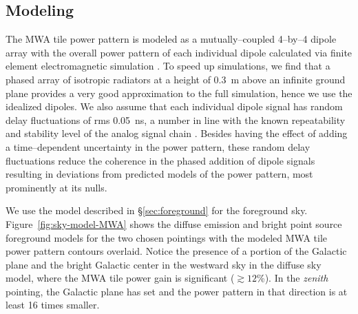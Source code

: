 \documentclass[preprint2,iop,numberedappendix,twocolappendix,appendixfloats]{emulateapj}
\begin{document}
\subsection{Modeling}\label{sec:modeling}

The MWA tile power pattern is modeled as a mutually--coupled 4--by--4 dipole array with the overall power pattern of each individual dipole calculated via finite element electromagnetic simulation \citep{sut14_arXiv}. To speed up simulations, we find that a phased array of isotropic radiators at a height of 0.3~m above an infinite ground plane provides a very good approximation to the full simulation, hence we use the idealized dipoles. We also assume that each individual dipole signal has random delay fluctuations of rms 0.05~ns, a number in line with the known repeatability and stability level of the analog signal chain \citep{bow07b}. Besides having the effect of adding a time--dependent uncertainty in the power pattern, these random delay fluctuations reduce the coherence in the phased addition of dipole signals resulting in deviations from predicted models of the power pattern, most prominently at its nulls. 

We use the model described in \S\ref{sec:foreground} for the foreground sky. Figure~\ref{fig:sky-model-MWA} shows the diffuse emission and bright point source foreground models for the two chosen pointings with the modeled MWA tile power pattern contours overlaid. Notice the presence of a portion of the Galactic plane and the bright Galactic center in the westward sky in the diffuse sky model, where the MWA tile power gain is significant ($\gtrsim 12$\%). In the {\it zenith} pointing, the Galactic plane has set and the power pattern in that direction is at least 16 times smaller. 
\end{document}
